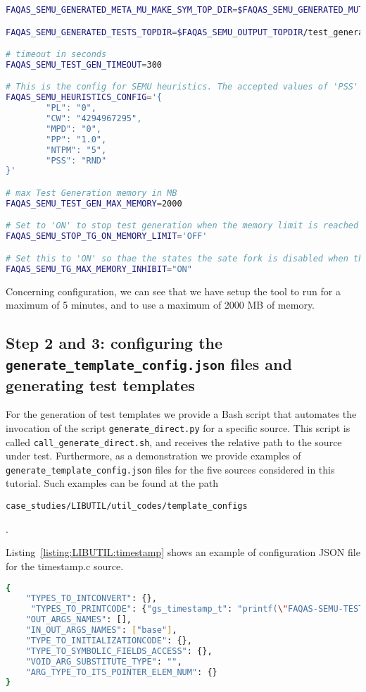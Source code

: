 \begin{lstlisting}[language=bash,label=listing:LIBUTIL:conf,caption=faqas\_semus\_conf.sh file for LIBUTIL case study.]
FAQAS_SEMU_GENERATED_META_MU_MAKE_SYM_TOP_DIR=$FAQAS_SEMU_GENERATED_MUTANTS_TOPDIR/"MakeSym-TestGen-Input"

FAQAS_SEMU_GENERATED_TESTS_TOPDIR=$FAQAS_SEMU_OUTPUT_TOPDIR/test_generation

# timeout in seconds
FAQAS_SEMU_TEST_GEN_TIMEOUT=300

# This is the config for SEMU heuristics. The accepted values of 'PSS' are 'RND' for random and 'MDO' for minimum distance to output
FAQAS_SEMU_HEURISTICS_CONFIG='{
        "PL": "0",
        "CW": "4294967295",
        "MPD": "0",
        "PP": "1.0",
        "NTPM": "5",
        "PSS": "RND"
}'

# max Test Generation memory in MB
FAQAS_SEMU_TEST_GEN_MAX_MEMORY=2000

# Set to 'ON' to stop test generation when the memory limit is reached
FAQAS_SEMU_STOP_TG_ON_MEMORY_LIMIT='OFF'

# Set this to 'ON' so thae the states the sate fork is disabled when the memory limit is reached, to avoid going much over it
FAQAS_SEMU_TG_MAX_MEMORY_INHIBIT="ON"
\end{lstlisting}

Concerning \SEMU configuration, we can see that we have setup the tool to run for a maximum of 5 minutes, and to use a maximum of 2000 MB of memory.

\subsection{Step 2 and 3: configuring the \texttt{generate\_template\_config.json} files and generating test templates}

For the generation of test templates we provide a Bash script that automates the invocation of the script \texttt{generate\_direct.py} for a specific source. This script is called \texttt{call\_generate\_direct.sh}, and receives the relative path to the source under test. Furthermore, as a demonstration we provide examples of \texttt{generate\_template\_config.json} files for the five sources considered in this tutorial. Such examples can be found at the path \begin{small}\texttt{case\_studies/LIBUTIL/util\_codes/template\_configs}\end{small}.

Listing~\ref{listing:LIBUTIL:timestamp} shows an example of configuration JSON file for the timestamp.c source.

\begin{lstlisting}[language=bash,label=listing:LIBUTIL:timestamp,caption=JSON configuration file for timestamp.c.]
{
    "TYPES_TO_INTCONVERT": {},
     "TYPES_TO_PRINTCODE": {"gs_timestamp_t": "printf(\"FAQAS-SEMU-TEST-OUTPUT: result_faqas_semu = tv_sec: %u, tv_nsec: %u\\n\", {}.tv_sec, {}.tv_nsec);"},
    "OUT_ARGS_NAMES": [],
    "IN_OUT_ARGS_NAMES": ["base"],
    "TYPE_TO_INITIALIZATIONCODE": {},
    "TYPE_TO_SYMBOLIC_FIELDS_ACCESS": {},
    "VOID_ARG_SUBSTITUTE_TYPE": "",
    "ARG_TYPE_TO_ITS_POINTER_ELEM_NUM": {}
}
\end{lstlisting}


